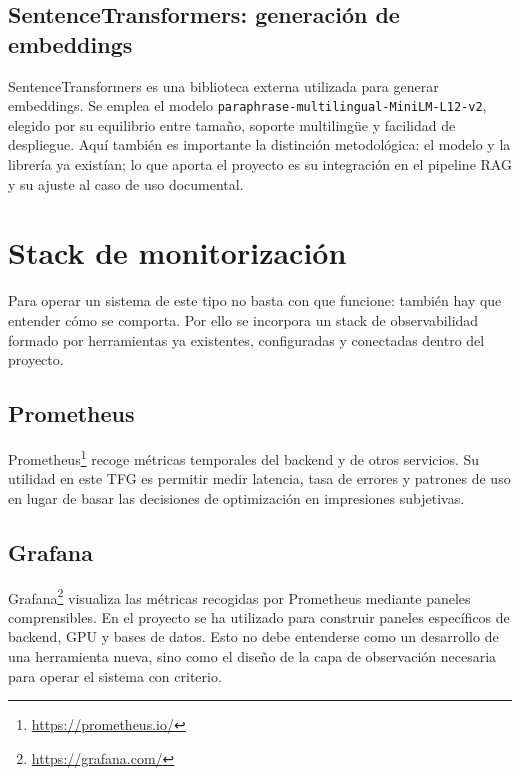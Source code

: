 \subsection{SentenceTransformers: generación de embeddings}

SentenceTransformers \cite{reimers2019sentence,sbertDocs} es una biblioteca externa utilizada para generar embeddings. Se emplea el modelo \texttt{paraphrase-multilingual-MiniLM-L12-v2}, elegido por su equilibrio entre tamaño, soporte multilingüe y facilidad de despliegue. Aquí también es importante la distinción metodológica: el modelo y la librería ya existían; lo que aporta el proyecto es su integración en el pipeline RAG y su ajuste al caso de uso documental.

\section{Stack de monitorización}
\label{sec:stack-monitorizacion}

Para operar un sistema de este tipo no basta con que funcione: también hay que entender cómo se comporta. Por ello se incorpora un stack de observabilidad formado por herramientas ya existentes, configuradas y conectadas dentro del proyecto.

\subsection{Prometheus}

Prometheus\footnote{\url{https://prometheus.io/}} recoge métricas temporales del backend y de otros servicios. Su utilidad en este TFG es permitir medir latencia, tasa de errores y patrones de uso en lugar de basar las decisiones de optimización en impresiones subjetivas.

\subsection{Grafana}

Grafana\footnote{\url{https://grafana.com/}} visualiza las métricas recogidas por Prometheus mediante paneles comprensibles. En el proyecto se ha utilizado para construir paneles específicos de backend, GPU y bases de datos. Esto no debe entenderse como un desarrollo de una herramienta nueva, sino como el diseño de la capa de observación necesaria para operar el sistema con criterio.

